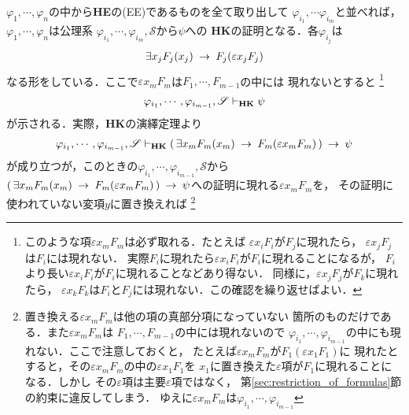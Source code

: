 	\begin{sketch}
		$\varphi_{1},\cdots,\varphi_{n}$の中から{\bf HE}の(EE)であるものを全て取り出して
		$\varphi_{i_{1}},\cdots\varphi_{i_{m}}$と並べれば，
		$\varphi_{1},\cdots,\varphi_{n}$は公理系
		$\varphi_{i_{1}},\cdots,\varphi_{i_{m}},\mathscr{S}$から$\psi$への
		{\bf HK}の証明となる．各$\varphi_{i_{j}}$は
		\begin{align}
			\exists x_{j} F_{j}(x_{j}) \hspace{0.25em}\rightarrow\hspace{0.25em} F_{j}(\varepsilon x_{j} F_{j})
		\end{align}
		なる形をしている．ここで$\varepsilon x_{m} F_{m}$は$F_{1},\cdots,F_{m-1}$の中には
		現れないとすると
		\footnote{
			このような項$\varepsilon x_{m} F_{m}$は必ず取れる．たとえば
			$\varepsilon x_{i} F_{i}$が$F_{j}$に現れたら，
			$\varepsilon x_{j} F_{j}$は$F_{i}$には現れない．
			実際$F_{i}$に現れたら$\varepsilon x_{i} F_{i}$が$F_{i}$に現れることになるが，
			$F_{i}$より長い$\varepsilon x_{i} F_{i}$が$F_{i}$に現れることなどあり得ない．
			同様に，$\varepsilon x_{j} F_{j}$が$F_{k}$に現れたら，
			$\varepsilon x_{k} F_{k}$は$F_{i}$と$F_{j}$には現れない．この確認を繰り返せばよい．
		}
		\begin{align}
			\varphi_{i_{1}},\cdots,\varphi_{i_{m-1}},\mathscr{S} 
			\vdash_{{\scriptsize \mbox{{\bf HK}}}} \psi
		\end{align}
		が示される．実際，{\bf HK}の演繹定理より
		\begin{align}
			\varphi_{i_{1}},\cdots,\varphi_{i_{m-1}},\mathscr{S} 
			\vdash_{{\scriptsize \mbox{{\bf HK}}}} 
			(\, \exists x_{m} F_{m}(x_{m}) \hspace{0.25em}\rightarrow\hspace{0.25em} F_{m}(\varepsilon x_{m} F_{m})\, ) \hspace{0.25em}\rightarrow\hspace{0.25em} \psi
		\end{align}
		が成り立つが，このときの$\varphi_{i_{1}},\cdots,\varphi_{i_{m-1}},\mathscr{S}$から
		$(\, \exists x_{m} F_{m}(x_{m}) \hspace{0.25em}\rightarrow\hspace{0.25em} F_{m}(\varepsilon x_{m} F_{m})\, ) 
		\hspace{0.25em}\rightarrow\hspace{0.25em} \psi$への証明に現れる$\varepsilon x_{m} F_{m}$を，
		その証明に使われていない変項$y$に置き換えれば
		\footnote{
			置き換える$\varepsilon x_{m} F_{m}$は他の項の真部分項になっていない
			箇所のものだけである．また$\varepsilon x_{m} F_{m}$は
			$F_{1},\cdots,F_{m-1}$の中には現れないので
			$\varphi_{i_{1}},\cdots,\varphi_{i_{m-1}}$の中にも現れない．ここで注意しておくと，
			たとえば$\varepsilon x_{m} F_{m}$が$F_{1}(\varepsilon x_{1} F_{1})$に
			現れたとすると，その$\varepsilon x_{m} F_{m}$の中の$\varepsilon x_{1} F_{1}$を
			$x_{1}$に置き換えた$\varepsilon$項が$F_{1}$に現れることになる．しかし
			その$\varepsilon$項は主要$\varepsilon$項ではなく，
			第\ref{sec:restriction_of_formulas}節の約束に違反してしまう．
			ゆえに$\varepsilon x_{m} F_{m}$は$\varphi_{i_{1}},\cdots,\varphi_{i_{m-1}}$
}
\end{sketch}
